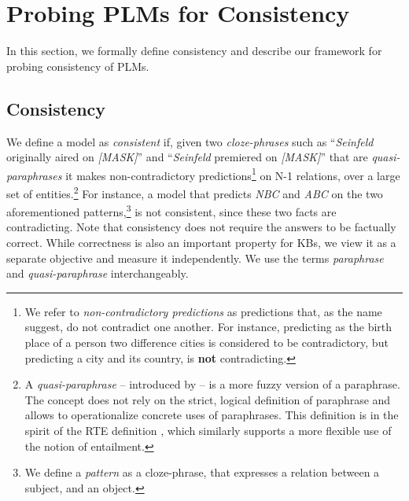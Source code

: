 \section{Probing PLMs for Consistency}
\label{sec:probe}

In this section, we formally define consistency and describe our framework for probing consistency of PLMs.


\subsection{Consistency}
We define a model as \emph{consistent} if, given  two
\textit{cloze-phrases} such as 
 ``\textit{Seinfeld} originally aired on \textit{[MASK]}'' and
``\textit{Seinfeld} premiered on \textit{[MASK]}'' that
are \textit{quasi-paraphrases} it makes non-contradictory
predictions\footnote{We refer to \textit{non-contradictory predictions} as predictions that, as the name suggest, do not contradict one another. For instance, predicting as the birth place of a person two difference cities is considered to be contradictory, but predicting a city and its country, is \textbf{not} contradicting.} on N-1 relations, over a large set of entities.\footnote{A \textit{quasi-paraphrase} -- introduced by \citet{what_is_paraphrase} -- is a more fuzzy version of a paraphrase. The concept does not rely
  on the strict, logical definition of paraphrase and
  allows to operationalize concrete uses of
  paraphrases. This definition is in the spirit of the RTE
  definition \cite{dagan-rte}, which similarly supports a
  more flexible use of the notion of entailment.}
 For instance, a model that predicts \textit{NBC} and \textit{ABC} on the two aforementioned patterns,\footnote{We define a \textit{pattern} as a cloze-phrase, that expresses a relation between a subject, and an object.} is not consistent, since these two facts are contradicting.
Note that consistency does not require the answers to be factually correct. While correctness is also an important property for KBs, we view it as a separate objective and measure it independently.
We use the terms \textit{paraphrase} and \textit{quasi-paraphrase} interchangeably.
 


